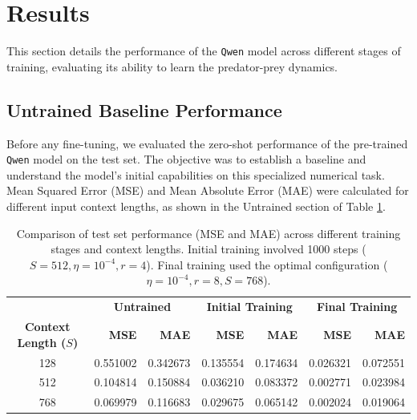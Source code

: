 \documentclass{article}
\begin{document}
\section{Results}

This section details the performance of the \texttt{Qwen} model across different stages of training, evaluating its ability to learn the predator-prey dynamics.

\subsection{Untrained Baseline Performance}

Before any fine-tuning, we evaluated the zero-shot performance of the pre-trained \texttt{Qwen} model on the test set. The objective was to establish a baseline and understand the model's initial capabilities on this specialized numerical task. Mean Squared Error (MSE) and Mean Absolute Error (MAE) were calculated for different input context lengths, as shown in the Untrained section of Table \ref{tab:training_stage_comparison}.

\begin{table}[!th]
\renewcommand{\arraystretch}{1.4}
\centering
\setlength{\tabcolsep}{8pt}
\begin{tabular}{c rr rr rr}
    \toprule
    & \multicolumn{2}{c}{\textbf{Untrained}}
    & \multicolumn{2}{c}{\textbf{Initial Training}} %
    & \multicolumn{2}{c}{\textbf{Final Training}} \\ %
    \cmidrule(lr){2-3} \cmidrule(lr){4-5} \cmidrule(lr){6-7}
    \textbf{Context Length ($S$)} & \textbf{MSE} & \textbf{MAE} & \textbf{MSE} & \textbf{MAE} & \textbf{MSE} & \textbf{MAE} \\
    \midrule
    128 & 0.551002 & 0.342673 & 0.135554 & 0.174634 & 0.026321 & 0.072551 \\
    512 & 0.104814 & 0.150884 & 0.036210 & 0.083372 & 0.002771 & 0.023984 \\
    768 & 0.069979 & 0.116683 & 0.029675 & 0.065142 & 0.002024 & 0.019064 \\
    \bottomrule
\end{tabular}
\caption{Comparison of test set performance (MSE and MAE) across different training stages and context lengths. Initial training involved 1000 steps ($S=512, \eta=10^{-4}, r=4$). Final training used the optimal configuration ($\eta=10^{-4}, r=8, S=768$).}
\label{tab:training_stage_comparison}
\end{table}
\end{document}
